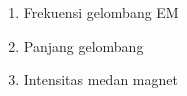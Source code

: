 \documentclass[12pt]{scrartcl}
\begin{document}
\begin{enumerate}[leftmargin=*]
\begin{enumerate}[leftmargin=*]
        \begin{answer}
            
        \end{answer}
        \item Frekuensi gelombang EM
        \begin{answer}
            
        \end{answer}
        \item Panjang gelombang
        \begin{answer}
            
        \end{answer}
        \item Intensitas medan magnet
        \begin{answer}
            
        \end{answer}
    \end{enumerate}

\end{enumerate}
\end{document}
